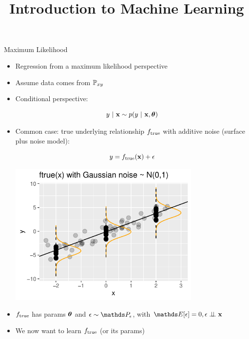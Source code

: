 \documentclass[11pt,compress,t,notes=noshow, xcolor=table]{beamer}
\title{Introduction to Machine Learning}
\begin{document}
    

\begin{vbframe}{Maximum Likelihood}

\begin{itemize}
\item Regression from a maximum likelihood perspective
\item Assume data comes from $\mathbb{P}_{xy}$ 
\item Conditional perspective: 

$$
	y~|~ \mathbf{x} \sim p(y~|~\mathbf{x}, \bm{\theta})
$$

\item
Common case:
true underlying relationship $f_{\text{true}}$ with additive noise (surface plus noise model): 

\begin{minipage}{0.5\textwidth}
$$
y = f_{\text{true}}(\mathbf{x}) + \epsilon
$$
\end{minipage}%
\begin{minipage}{0.5\textwidth}
\includegraphics[width = 0.75\textwidth]{figure/ftrue.pdf}
\end{minipage}

\item $f_{\text{true}}$ has params $\bm{\theta}$ and $\eps \sim\P_\eps$, with $\E[\eps] = 0, \epsilon \perp \!\!\! \perp \xv$

\item We now want to learn $f_{\text{true}}$ (or its params)

\end{itemize}


\end{vbframe}
\end{document}
